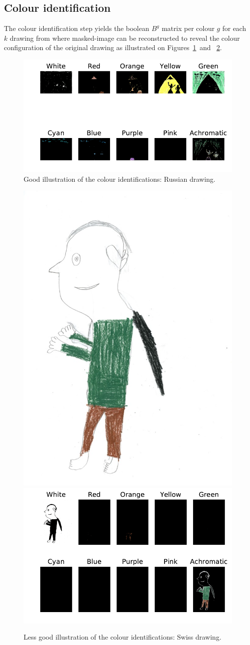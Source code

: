 \documentclass[11pt,a4paper]{article}
\begin{document}
\subsection{Colour identification}
\label{sec:results_identification}
The colour identification step yields the boolean $B^g$ matrix per colour $g$ for each $k$ drawing from where masked-image can be reconstructed to reveal the colour configuration of the original drawing as illustrated on Figures~\ref{fig:example1}~and ~\ref{fig:example2}.

\begin{figure}[!h]
	\centering
	\includegraphics[width=0.62\linewidth]{figures/ru08_bo_f_pb_07_05_ali-rno_filter_mask.pdf}\hfil
	\caption{Good illustration of the colour identifications: Russian drawing.}
	\label{fig:example1}
\end{figure}

\begin{figure}[h!]
	\centering
	\includegraphics[width=0.32\linewidth]{figures/ch15_fr_m_rrs_08_08_fim-r.jpg}
	\includegraphics[width=0.62\linewidth]{figures/ch15_fr_m_rrs_08_08_fim-rno_filter_mask.pdf}
	\caption{Less good illustration of the colour identifications: Swiss drawing.}
	\label{fig:example2}
\end{figure}
\end{document}
